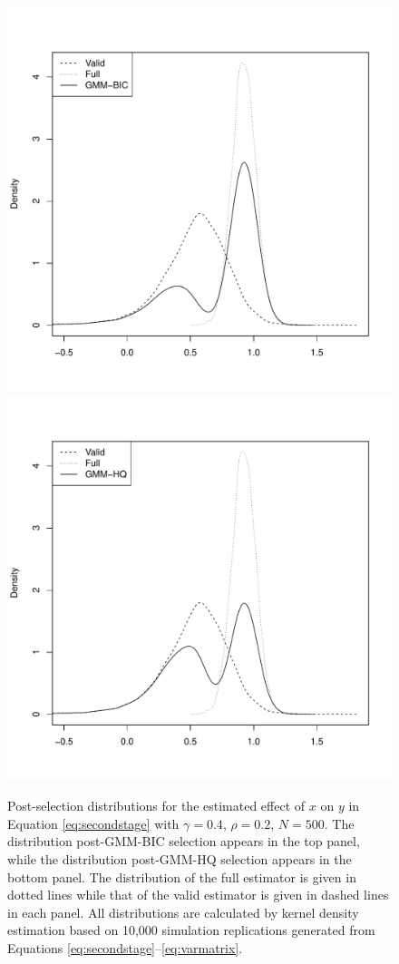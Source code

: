\documentclass[12pt]{article}
\theoremstyle{definition}
\begin{document}
\begin{figure}[htbp]
\begin{center}
	\includegraphics[scale = 0.48]{GMM_BIC}
	\includegraphics[scale = 0.48]{GMM_HQ}
\caption{ \small Post-selection distributions for the estimated effect of $x$ on $y$ in Equation \ref{eq:secondstage} with $\gamma = 0.4$, $\rho = 0.2$, $N=500$. The distribution post-GMM-BIC selection appears in the top panel, while the distribution post-GMM-HQ selection appears in the bottom panel. The distribution of the full estimator is given in dotted lines while that of the valid estimator is given in dashed lines in each panel. All distributions are calculated by kernel density estimation based on 10,000 simulation replications generated from Equations \ref{eq:secondstage}--\ref{eq:varmatrix}.}
\label{fig:consist}
\end{center}
\end{figure}
\end{document}
